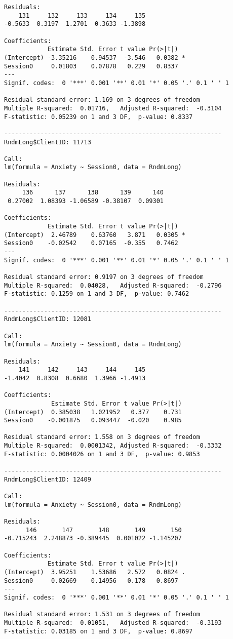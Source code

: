 \documentclass[
  11pt,
]{book}
\begin{document}
\begin{verbatim}
Residuals:
    131     132     133     134     135 
-0.5633  0.3197  1.2701  0.3633 -1.3898 

Coefficients:
            Estimate Std. Error t value Pr(>|t|)  
(Intercept) -3.35216    0.94537  -3.546   0.0382 *
Session0     0.01803    0.07878   0.229   0.8337  
---
Signif. codes:  0 '***' 0.001 '**' 0.01 '*' 0.05 '.' 0.1 ' ' 1

Residual standard error: 1.169 on 3 degrees of freedom
Multiple R-squared:  0.01716,   Adjusted R-squared:  -0.3104 
F-statistic: 0.05239 on 1 and 3 DF,  p-value: 0.8337

------------------------------------------------------------ 
RndmLong$ClientID: 11713

Call:
lm(formula = Anxiety ~ Session0, data = RndmLong)

Residuals:
     136      137      138      139      140 
 0.27002  1.08393 -1.06589 -0.38107  0.09301 

Coefficients:
            Estimate Std. Error t value Pr(>|t|)  
(Intercept)  2.46789    0.63760   3.871   0.0305 *
Session0    -0.02542    0.07165  -0.355   0.7462  
---
Signif. codes:  0 '***' 0.001 '**' 0.01 '*' 0.05 '.' 0.1 ' ' 1

Residual standard error: 0.9197 on 3 degrees of freedom
Multiple R-squared:  0.04028,   Adjusted R-squared:  -0.2796 
F-statistic: 0.1259 on 1 and 3 DF,  p-value: 0.7462

------------------------------------------------------------ 
RndmLong$ClientID: 12081

Call:
lm(formula = Anxiety ~ Session0, data = RndmLong)

Residuals:
    141     142     143     144     145 
-1.4042  0.8308  0.6680  1.3966 -1.4913 

Coefficients:
             Estimate Std. Error t value Pr(>|t|)
(Intercept)  0.385038   1.021952   0.377    0.731
Session0    -0.001875   0.093447  -0.020    0.985

Residual standard error: 1.558 on 3 degrees of freedom
Multiple R-squared:  0.0001342, Adjusted R-squared:  -0.3332 
F-statistic: 0.0004026 on 1 and 3 DF,  p-value: 0.9853

------------------------------------------------------------ 
RndmLong$ClientID: 12409

Call:
lm(formula = Anxiety ~ Session0, data = RndmLong)

Residuals:
      146       147       148       149       150 
-0.715243  2.248873 -0.389445  0.001022 -1.145207 

Coefficients:
            Estimate Std. Error t value Pr(>|t|)  
(Intercept)  3.95251    1.53686   2.572   0.0824 .
Session0     0.02669    0.14956   0.178   0.8697  
---
Signif. codes:  0 '***' 0.001 '**' 0.01 '*' 0.05 '.' 0.1 ' ' 1

Residual standard error: 1.531 on 3 degrees of freedom
Multiple R-squared:  0.01051,   Adjusted R-squared:  -0.3193 
F-statistic: 0.03185 on 1 and 3 DF,  p-value: 0.8697
\end{verbatim}
\end{document}
